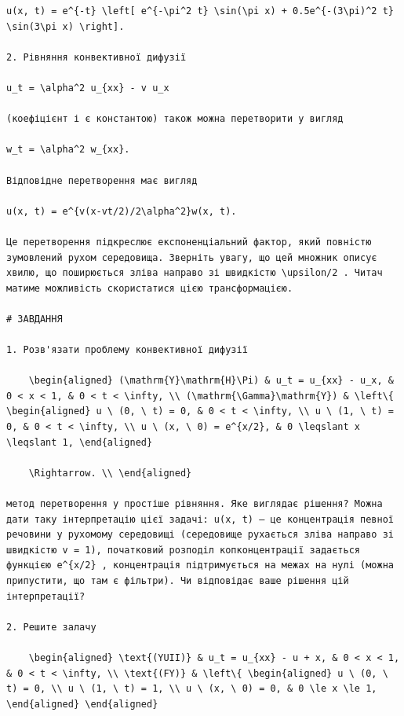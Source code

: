 \documentclass[
  ukrainian,
]{article}
\begin{document}
\begin{verbatim}
u(x, t) = e^{-t} \left[ e^{-\pi^2 t} \sin(\pi x) + 0.5e^{-(3\pi)^2 t} \sin(3\pi x) \right].

2. Рівняння конвективної дифузії

u_t = \alpha^2 u_{xx} - v u_x

(коефіцієнт і є константою) також можна перетворити у вигляд

w_t = \alpha^2 w_{xx}.

Відповідне перетворення має вигляд

u(x, t) = e^{v(x-vt/2)/2\alpha^2}w(x, t).

Це перетворення підкреслює експоненціальний фактор, який повністю зумовлений рухом середовища. Зверніть увагу, що цей множник описує хвилю, що поширюється зліва направо зі швидкістю \upsilon/2 . Читач матиме можливість скористатися цією трансформацією.

# ЗАВДАННЯ

1. Розв'язати проблему конвективної дифузії

    \begin{aligned} (\mathrm{Y}\mathrm{H}\Pi) & u_t = u_{xx} - u_x, & 0 < x < 1, & 0 < t < \infty, \\ (\mathrm{\Gamma}\mathrm{Y}) & \left\{ \begin{aligned} u \ (0, \ t) = 0, & 0 < t < \infty, \\ u \ (1, \ t) = 0, & 0 < t < \infty, \\ u \ (x, \ 0) = e^{x/2}, & 0 \leqslant x \leqslant 1, \end{aligned}

    \Rightarrow. \\ \end{aligned}

метод перетворення у простіше рівняння. Яке виглядає рішення? Можна дати таку інтерпретацію цієї задачі: u(x, t) — це концентрація певної речовини у рухомому середовищі (середовище рухається зліва направо зі швидкістю v = 1), початковий розподіл копконцентрації задається функцією e^{x/2} , концентрація підтримується на межах на нулі (можна припустити, що там є фільтри). Чи відповідає ваше рішення цій інтерпретації?

2. Решите залачу

    \begin{aligned} \text{(YUII)} & u_t = u_{xx} - u + x, & 0 < x < 1, & 0 < t < \infty, \\ \text{(FY)} & \left\{ \begin{aligned} u \ (0, \ t) = 0, \\ u \ (1, \ t) = 1, \\ u \ (x, \ 0) = 0, & 0 \le x \le 1, \end{aligned} \end{aligned}


\end{verbatim}
\end{document}
